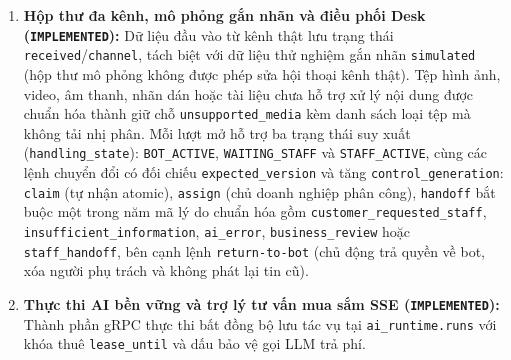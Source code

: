\begin{enumerate}
    Cả hai kênh đều hỗ trợ \texttt{pause}, \texttt{resume}, \texttt{disconnect} (hủy đăng ký webhook và xóa sạch ciphertext); Telegram hỗ trợ thêm \texttt{rotate\_\hspace{0pt}token} kiểm tra khớp \texttt{account\_\hspace{0pt}id} cũ (sai bot trả \texttt{409 Conflict}).
  \item \textbf{Hộp thư đa kênh, mô phỏng gắn nhãn và điều phối Desk (\texttt{IMPLEMENTED}):} Dữ liệu đầu vào từ kênh thật lưu trạng thái \texttt{received}/\texttt{channel}, tách biệt với dữ liệu thử nghiệm gắn nhãn \texttt{simulated} (hộp thư mô phỏng không được phép sửa hội thoại kênh thật).
    Tệp hình ảnh, video, âm thanh, nhãn dán hoặc tài liệu chưa hỗ trợ xử lý nội dung được chuẩn hóa thành giữ chỗ \texttt{unsupported\_\hspace{0pt}media} kèm danh sách loại tệp mà không tải nhị phân.
    Mỗi lượt mở hỗ trợ ba trạng thái suy xuất (\texttt{handling\_\hspace{0pt}state}): \texttt{BOT\_\hspace{0pt}ACTIVE}, \texttt{WAITING\_\hspace{0pt}STAFF} và \texttt{STAFF\_\hspace{0pt}ACTIVE}, cùng các lệnh chuyển đổi có đối chiếu \texttt{expected\_\hspace{0pt}version} và tăng \texttt{control\_\hspace{0pt}generation}: \texttt{claim} (tự nhận atomic), \texttt{assign} (chủ doanh nghiệp phân công), \texttt{handoff} bắt buộc một trong năm mã lý do chuẩn hóa gồm \texttt{customer\_\hspace{0pt}requested\_\hspace{0pt}staff}, \texttt{insufficient\_\hspace{0pt}information}, \texttt{ai\_\hspace{0pt}error}, \texttt{business\_\hspace{0pt}review} hoặc \texttt{staff\_\hspace{0pt}handoff}, bên cạnh lệnh \texttt{return-\hspace{0pt}to-\hspace{0pt}bot} (chủ động trả quyền về bot, xóa người phụ trách và không phát lại tin cũ).
  \item \textbf{Thực thi AI bền vững và trợ lý tư vấn mua sắm SSE (\texttt{IMPLEMENTED}):} Thành phần gRPC thực thi bất đồng bộ lưu tác vụ tại \texttt{ai\_\hspace{0pt}runtime.\hspace{0pt}runs} với khóa thuê \texttt{lease\_\hspace{0pt}until} và dấu bảo vệ gọi LLM trả phí.

\end{enumerate}
